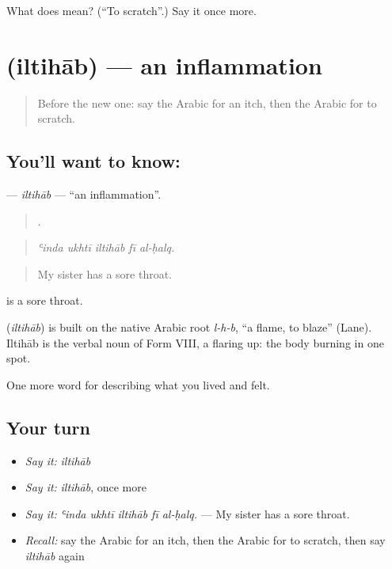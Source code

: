 \begin{tcolorbox}[breakable,colback=teal!4,colframe=teal!35!black,title={Before you move on}]
What does  mean? (\textquotedblleft{}To scratch\textquotedblright{}.) Say it once more.
\end{tcolorbox}
\section[\texorpdfstring{\ar{التهاب} (iltihāb)}{التهاب (iltihāb)}]{ (iltihāb) — an inflammation}

\label{lesson:AR-C508-iltihab}



\begin{quote}
Before the new one: say the Arabic for an itch, then the Arabic for to scratch.
\end{quote}

\subsection*{You'll want to know: }
\textbf{} — \emph{iltihāb} — \textquotedblleft{}an inflammation\textquotedblright{}.

\begin{quote}
    .
\end{quote}

\begin{quote}
\emph{ʿinda ukhtī iltihāb fī al-ḥalq.}
\end{quote}

\begin{quote}
My sister has a sore throat.
\end{quote}

  is a sore throat.

\begin{cousinweb}
\textbf{} (\emph{iltihāb}) is built on the native Arabic root \emph{l-h-b}, \textquotedblleft{}a flame, to blaze\textquotedblright{} (Lane). Iltihāb is the verbal noun of Form VIII, a flaring up: the body burning in one spot.
\end{cousinweb}

\begin{grammarlens}[title={What you've built}]
One more word for describing what you lived and felt.
\end{grammarlens}

\subsection*{Your turn}
\begin{itemize}
\raggedright
  \item \emph{Say it:} \emph{iltihāb}
  \item \emph{Say it:} \emph{iltihāb}, once more
  \item \emph{Say it:} \emph{ʿinda ukhtī iltihāb fī al-ḥalq.} — My sister has a sore throat.
  \item \emph{Recall:} say the Arabic for an itch, then the Arabic for to scratch, then say \emph{iltihāb} again
\end{itemize}


